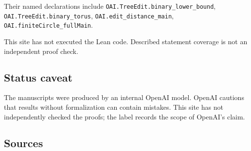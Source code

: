 \documentclass[11pt]{article}
\begin{document}
Their named declarations include \texttt{OAI.TreeEdit.binary\_lower\_bound}, \texttt{OAI.TreeEdit.binary\_torus}, \texttt{OAI.edit\_distance\_main}, \texttt{OAI.finiteCircle\_fullMain}.

This site has not executed the Lean code. Described statement coverage is not an independent proof check.

\subsection{Status caveat}
The manuscripts were produced by an internal OpenAI model. OpenAI cautions that results without formalization can contain mistakes. This site has not independently checked the proofs; the label records the scope of OpenAI's claim.

\subsection{Sources}
\end{document}
